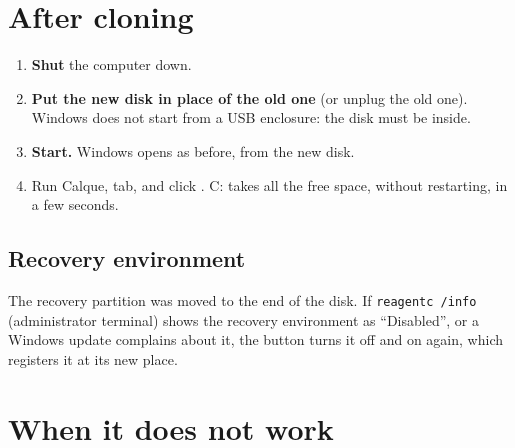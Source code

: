 \section{After cloning}\label{sec:apres}

\begin{enumerate}
\item \textbf{Shut} the computer down.
\item \textbf{Put the new disk in place of the old one} (or unplug the old one). Windows does not start
      from a USB enclosure: the disk must be inside.
\item \textbf{Start.} Windows opens as before, from the new disk.
\item Run Calque,  tab, and click . C: takes all the free space,
      without restarting, in a few seconds.
\end{enumerate}



\subsection*{Recovery environment}
The recovery partition was moved to the end of the disk. If \texttt{reagentc /info} (administrator
terminal) shows the recovery environment as “Disabled”, or a Windows update complains about it, the
 button turns it off and on again, which registers it at its new
place.

\section{When it does not work}

